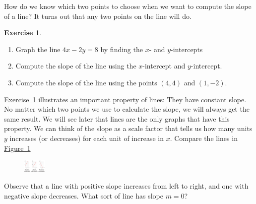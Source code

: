 \documentclass[10pt,]{book}
\theoremstyle{plain}
\theoremstyle{definition}
\newtheorem{exercise}[theorem]{Exercise}
\theoremstyle{definition}
\numberwithin{equation}{section}
\begin{document}
    How do we know which two points to choose when we want to compute the slope of a line? It turns out that any two points on the line will do.
%
\begin{exercise}\label{exercise-slope-any-points}
\leavevmode%
\begin{enumerate}[label=*\alph**]
\item\hypertarget{li-142}{}Graph the line \(4x − 2y = 8\) by finding the \(x\)- and \(y\)-intercepts\item\hypertarget{li-143}{}Compute the slope of the line using the \(x\)-intercept and \(y\)-intercept.\item\hypertarget{li-144}{}Compute the slope of the line using the points \((4, 4)\) and \((1, −2)\).\end{enumerate}
\end{exercise}
\par

    \hyperref[exercise-slope-any-points]{Exercise~\ref{exercise-slope-any-points}} illustrates an important property of lines: They have constant slope. No matter which two points we use to calculate the slope, we will always get the same result. We will see later that lines are the only graphs that have this property. We can think of the slope as a scale factor that tells us how many units \(y\) increases (or decreases) for each unit of increase in \(x\). Compare the lines in \hyperref[fig-slope-scale-factor]{Figure~\ref{fig-slope-scale-factor}}
    \leavevmode%
\begin{figure}
\centering
\includegraphics[width=0.100\textwidth,]{images/fig-slope-scale-factor.svg}\caption{\label{fig-slope-scale-factor}}
\end{figure}

    Observe that a line with positive slope increases from left to right, and one with negative slope decreases. What sort of line has slope \(m = 0\)?
%
\typeout{************************************************}
\typeout{************************************************}
\end{document}
